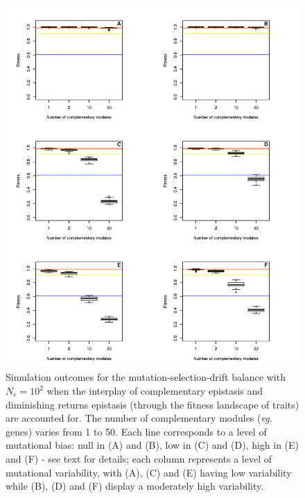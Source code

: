 \documentclass[11pt,onecolumn]{article}
\begin{document}
\begin{figure}[h!]
    \centering
    \includegraphics[scale=0.75,trim=0cm 0cm 0cm 0cm,clip]{Evo_Outcomes_Ne100.jpeg}
    \caption{Simulation outcomes for the mutation-selection-drift balance with $N_e=10^2$ when the interplay of complementary epistasis and diminishing returns epistasis (through the fitness landscape of traits) are accounted for. The number of complementary modules (\textit{eg.} genes) varies from 1 to 50. Each line corresponds to a level of mutational bias: null in (A) and (B), low in (C) and (D), high in (E) and (F) - see text for details; each column represents a level of mutational variability, with (A), (C) and (E) having low variability while (B), (D) and (F) display a moderately high variability.}
    \label{fig:Outcomes100}
\end{figure}
\end{document}

